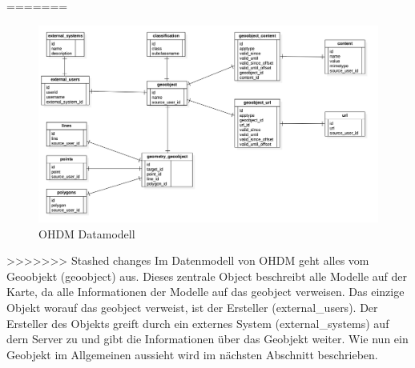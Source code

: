 =======
\begin{figure}[h!]
\centering
\includegraphics[width=127mm]{ohdm_datenmodell/Bilder/ohdm_data_modell.png}
\caption{OHDM Datamodell}
\label{fig:datamodell}
\end{figure}
>>>>>>> Stashed changes
Im Datenmodell von OHDM geht alles vom Geoobjekt (geoobject) aus. Dieses zentrale Object beschreibt alle Modelle auf der Karte, da alle Informationen der Modelle auf das geobject verweisen. Das einzige Objekt worauf das geobject verweist, ist der Ersteller (external\_users). Der Ersteller des Objekts greift durch ein externes System (external\_systems) auf dern Server zu und gibt die Informationen über das Geobjekt weiter. Wie nun ein Geobjekt im Allgemeinen aussieht wird im nächsten Abschnitt beschrieben.

